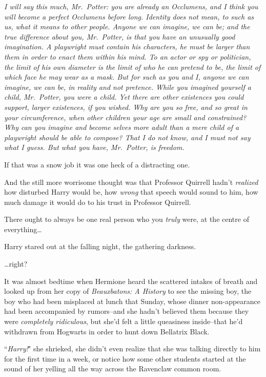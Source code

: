 \emph{I will say this much, Mr.~Potter: you are already an Occlumens, and I think you will become a perfect Occlumens before long. Identity does not mean, to such as us, what it means to other people. Anyone we can imagine, we can be; and the true difference about you, Mr.~Potter, is that you have an unusually good imagination. A playwright must contain his characters, he must be larger than them in order to enact them within his mind. To an actor or spy or politician, the limit of his own diameter is the limit of who he can pretend to be, the limit of which face he may wear as a mask. But for such as you and I, anyone we can imagine, we can \emph{be}, in reality and not pretence. While you imagined yourself a child, Mr.~Potter, you \emph{were} a child. Yet there are other existences you could support, larger existences, if you wished. Why are you so free, and so great in your circumference, when other children your age are small and constrained? Why can you imagine and \emph{become} selves more adult than a mere child of a playwright should be able to compose? That I do not know, and I must not say what I guess. But what you have, Mr.~Potter, is freedom.}

If that was a snow job it was one heck of a distracting one.

And the still more worrisome thought was that Professor Quirrell hadn't \emph{realized} how disturbed Harry would be, how \emph{wrong} that speech would sound to him, how much damage it would do to his trust in Professor Quirrell.

There ought to always be one real person who you \emph{truly} were, at the centre of everything{\ldots}

Harry stared out at the falling night, the gathering darkness.

{\ldots}right?

\later

It was almost bedtime when Hermione heard the scattered intakes of breath and looked up from her copy of \emph{Beauxbatons: A History} to see the missing boy, the boy who had been misplaced at lunch that Sunday, whose dinner non-appearance had been accompanied by rumors\---and she hadn't believed them because they were \emph{completely ridiculous}, but she'd felt a little queasiness inside\---that he'd withdrawn from Hogwarts in order to hunt down Bellatrix Black.

``\emph{Harry!}" she shrieked, she didn't even realize that she was talking directly to him for the first time in a week, or notice how some other students started at the sound of her yelling all the way across the Ravenclaw common room.

